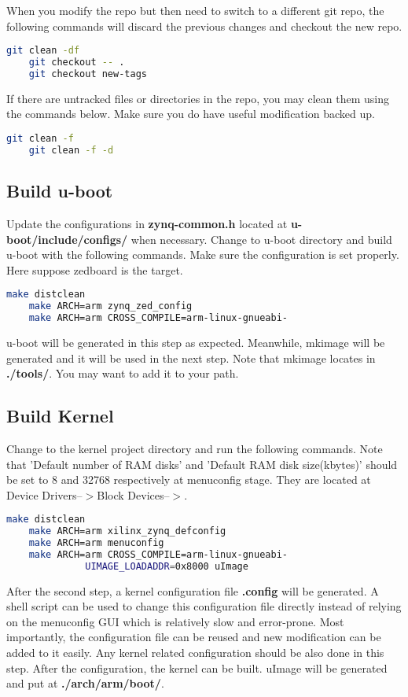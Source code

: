 \documentclass[12pt]{article} %
\begin{document}
When you modify the repo but then need to switch to a different git repo, the following commands will 
discard the previous changes and checkout the new repo.

\begin{lstlisting}[language=bash]
    git clean -df
    git checkout -- .
    git checkout new-tags 
\end{lstlisting}

If there are untracked files or directories in the repo, you may clean them using the commands below.
Make sure you do have useful modification backed up.
\begin{lstlisting}[language=bash]
    git clean -f
    git clean -f -d
\end{lstlisting}

\subsection{Build u-boot}
Update the configurations in \textbf{zynq-common.h} located at \textbf{u-boot/include/configs/} when necessary.
Change to u-boot directory and build u-boot with the following commands. Make sure the configuration is set properly.
Here suppose zedboard is the target.
\begin{lstlisting}[language=bash]
    make distclean
    make ARCH=arm zynq_zed_config
    make ARCH=arm CROSS_COMPILE=arm-linux-gnueabi- 
\end{lstlisting}

u-boot will be generated in this step as expected. Meanwhile, mkimage will be generated and it will 
be used in the next step. Note that mkimage locates in \textbf{./tools/}. You may want to add it to your 
path.

\subsection{Build Kernel}
Change to the kernel project directory and run the following commands.
Note that 'Default number of RAM disks' and 'Default RAM disk size(kbytes)' 
should be set to 8 and 32768 respectively at menuconfig stage. They are located at 
Device Drivers--$>$Block Devices--$>$.

\begin{lstlisting}[language=bash]
    make distclean
    make ARCH=arm xilinx_zynq_defconfig
    make ARCH=arm menuconfig
    make ARCH=arm CROSS_COMPILE=arm-linux-gnueabi-
              UIMAGE_LOADADDR=0x8000 uImage
\end{lstlisting}
After the second step, a kernel configuration file \textbf{.config} will be generated.
A shell script can be used to change this configuration file directly instead of relying on the 
menuconfig GUI which is relatively slow and error-prone. Most importantly, the configuration 
file can be reused and new modification can be added to it easily. 
Any kernel related configuration should be also done in this step. 
After the configuration, the kernel can be built. 
uImage will be generated and put at \textbf{./arch/arm/boot/}.
\end{document}
